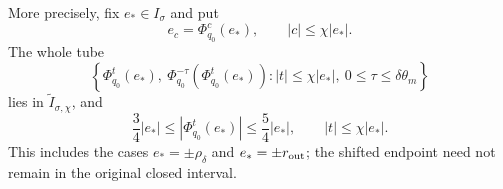 \begin{lemma}
More precisely, fix \(e_*\in I_\sigma\) and put
\[
 e_c=\Phi_{q_0}^{c}(e_*),\qquad |c|\le\chi|e_*|.
\]
The whole tube
\begin{equation}
 \left\{\Phi_{q_0}^{t}(e_*),\
   \Phi_{q_0}^{-\tau}(\Phi_{q_0}^{t}(e_*)):
   |t|\le\chi|e_*|,\ 0\le\tau\le\delta\theta_m\right\}
                                                        \label{eq:raw-assembler-flow-backtrack-tube}
\end{equation}
lies in \(\widetilde I_{\sigma,\chi}\), and
\begin{equation}
 \frac34|e_*|\le|\Phi_{q_0}^{t}(e_*)|
       \le\frac54|e_*|,
 \qquad |t|\le\chi|e_*|.                        \label{eq:raw-assembler-relative-flow-bound}
\end{equation}
This includes the cases \(e_*=\pm\rho_\delta\) and
\(e_*=\pm r_{\rm out}\); the shifted endpoint need not remain in the
original closed interval.


\end{lemma}
